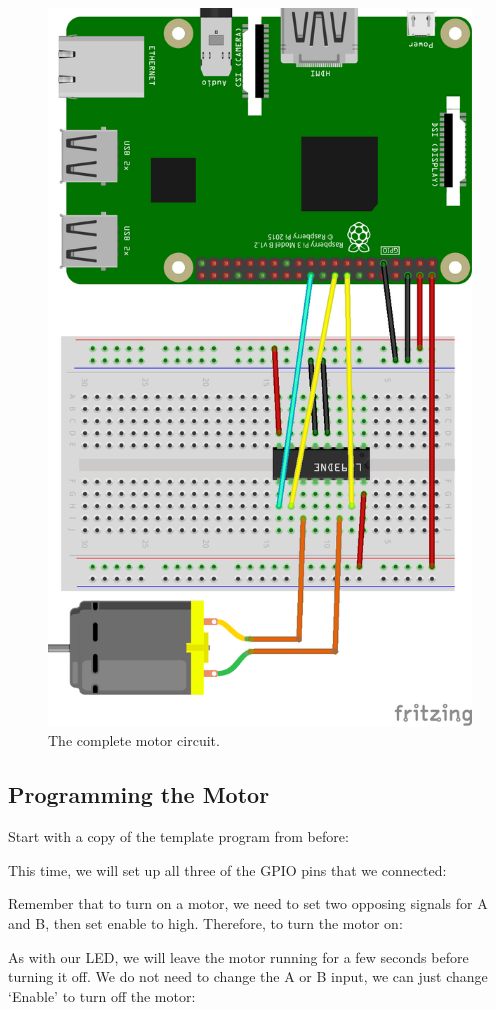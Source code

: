 		\begin{figure}[h]
			\centering
			\includegraphics[width=0.6\linewidth]{sections/2_motor/schematic_5}
			\caption{The complete motor circuit.}
			\label{fig:schematic_5}
		\end{figure}
		
	\subsection{Programming the Motor}
	
		Start with a copy of the template program from before:
		
		
		
		This time, we will set up all three of the GPIO pins that we connected:
	
		
		
		Remember that to turn on a motor, we need to set two opposing signals for A and B, then set enable to high. Therefore, to turn the motor on:
		
		
		
		As with our LED, we will leave the motor running for a few seconds before turning it off. We do not need to change the A or B input, we can just change `Enable' to turn off the motor:
		
